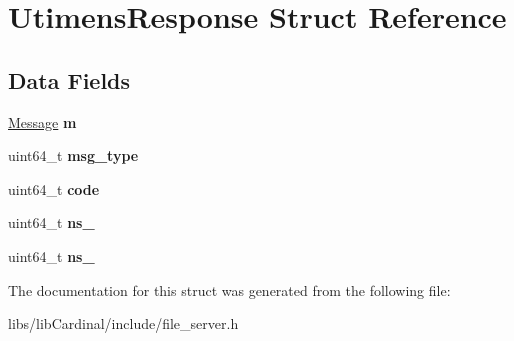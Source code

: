 \hypertarget{structUtimensResponse}{}\section{Utimens\+Response Struct Reference}
\label{structUtimensResponse}
\subsection*{Data Fields}
\begin{DoxyCompactItemize}
\item 
\hyperlink{structMessage}{Message} {\bfseries m}\hypertarget{structUtimensResponse_ae388f407d8834237147f775b18208b97}{}\label{structUtimensResponse_ae388f407d8834237147f775b18208b97}

\item 
uint64\+\_\+t {\bfseries msg\+\_\+type}\hypertarget{structUtimensResponse_a25930f4fbdf629b608fe533a02e3d8a0}{}\label{structUtimensResponse_a25930f4fbdf629b608fe533a02e3d8a0}

\item 
uint64\+\_\+t {\bfseries code}\hypertarget{structUtimensResponse_ae3562b37ad5092a7ab52b32a433b5df3}{}\label{structUtimensResponse_ae3562b37ad5092a7ab52b32a433b5df3}

\item 
uint64\+\_\+t {\bfseries ns\+\_}\hypertarget{structUtimensResponse_a5fcf13235c319de6c245772466ed01c3}{}\label{structUtimensResponse_a5fcf13235c319de6c245772466ed01c3}

\item 
uint64\+\_\+t {\bfseries ns\+\_}\hypertarget{structUtimensResponse_acb491ba7c65c07c92b49487c466ca823}{}\label{structUtimensResponse_acb491ba7c65c07c92b49487c466ca823}

\end{DoxyCompactItemize}


The documentation for this struct was generated from the following file\+:\begin{DoxyCompactItemize}
\item 
libs/lib\+Cardinal/include/file\+\_\+server.\+h\end{DoxyCompactItemize}

